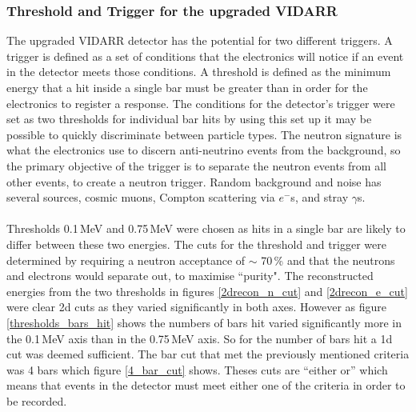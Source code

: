 \documentclass[12pt,a4paper]{article}
\begin{document}
\subsubsection{Threshold and Trigger for the upgraded VIDARR}\label{trigger_section_by_hand}
The upgraded VIDARR detector has the potential for two different triggers. A trigger is defined as a set of conditions that the electronics will notice if an event in the detector meets those conditions. A threshold is defined as the minimum energy that a hit inside a single bar must be greater than in order for the electronics to register a response. The conditions for the detector's trigger were set as two thresholds for individual bar hits by using this set up it may be possible to quickly discriminate between particle types. The neutron signature is what the electronics use to discern anti-neutrino events from the background, so the primary objective of the trigger is to separate the neutron events from all other events, to create a neutron trigger. Random background and noise has several sources, cosmic muons, Compton scattering via $e^-$s, and stray $\gamma$s. \\\\
Thresholds 0.1\,MeV and 0.75\,MeV were chosen as hits in a single bar are likely to differ between these two energies. The cuts for the threshold and trigger were determined by requiring a neutron acceptance of $\sim$ 70\,\% and that the neutrons and electrons would separate out, to maximise ``purity". The reconstructed energies from the two thresholds in figures \ref{2drecon_n_cut} and \ref{2drecon_e_cut} were clear 2d cuts as they varied significantly in both axes. However as figure \ref{thresholds_bars_hit} shows the numbers of bars hit varied significantly more in the 0.1\,MeV axis than in the 0.75\,MeV axis. So for the number of bars hit a 1d cut was deemed sufficient. The bar cut that met the previously mentioned criteria was 4 bars which figure \ref{4_bar_cut} shows. Theses cuts are ``either or'' which means that events in the detector must meet either one of the criteria in order to be recorded.%
\end{document}
